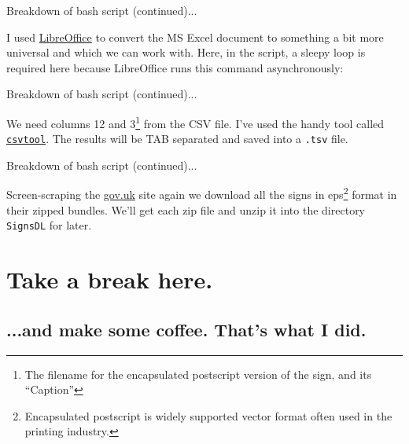 \begin{frame}{Breakdown of bash script (continued)...}
\parbox{\textwidth}{\small I used \href{https://www.libreoffice.org/}{LibreOffice} to convert the MS Excel document to something a bit more universal and which we can work with. Here, in the script, a sleepy loop is required here because LibreOffice runs this command asynchronously:}
\tiny

\end{frame}


\begin{frame}{Breakdown of bash script (continued)...}
\parbox{\textwidth}{We need columns 12 and 3\footnote{The filename for the encapsulated postscript version of the sign, and its ``Caption''} from the CSV file. I've used the handy tool called \href{https://packages.ubuntu.com/bionic/csvtool}{\tt csvtool}. The results will be TAB separated and saved into a {\tt .tsv} file.}
\tiny

\end{frame}

\begin{frame}{Breakdown of bash script (continued)...}
\parbox{\textwidth}{\small Screen-scraping the \href{https://www.gov.uk/guidance/traffic-sign-images}{gov.uk} site again we download all the signs in eps\footnote{Encapsulated postscript is widely supported vector format often used in the printing industry.} format in their zipped bundles. We'll get each zip file and unzip it into the directory {\tt SignsDL} for later.}
\tiny

\end{frame}

\section*{Take a break here.}
\subsection{...and make some coffee. That's what I did.}
